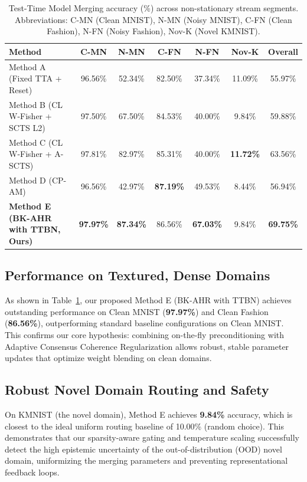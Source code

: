 \documentclass{article}
\theoremstyle{plain}
\theoremstyle{definition}
\theoremstyle{remark}
\begin{document}
\begin{table}[t]
  \caption{Test-Time Model Merging accuracy (\%) across non-stationary stream segments. Abbreviations: C-MN (Clean MNIST), N-MN (Noisy MNIST), C-FN (Clean Fashion), N-FN (Noisy Fashion), Nov-K (Novel KMNIST).}
  \label{tab:results}
  \vskip 0.15in
  \begin{center}
    \begin{small}
      \begin{tabular}{lcccccc}
        \toprule
        Method & C-MN & N-MN & C-FN & N-FN & Nov-K & Overall \\
        \midrule
        Method A (Fixed TTA + Reset) & 96.56\% & 52.34\% & 82.50\% & 37.34\% & 11.09\% & 55.97\% \\
        Method B (CL W-Fisher + SCTS L2) & 97.50\% & 67.50\% & 84.53\% & 40.00\% & 9.84\% & 59.88\% \\
        Method C (CL W-Fisher + A-SCTS) & 97.81\% & 82.97\% & 85.31\% & 40.00\% & \textbf{11.72\%} & 63.56\% \\
        Method D (CP-AM) & 96.56\% & 42.97\% & \textbf{87.19\%} & 49.53\% & 8.44\% & 56.94\% \\
        \midrule
        \textbf{Method E (BK-AHR with TTBN, Ours)} & \textbf{97.97\%} & \textbf{87.34\%} & 86.56\% & \textbf{67.03\%} & 9.84\% & \textbf{69.75\%} \\
        \bottomrule
      \end{tabular}
    \end{small}
  \end{center}
  \vskip -0.1in
\end{table}

\subsection{Performance on Textured, Dense Domains}
As shown in Table~\ref{tab:results}, our proposed Method E (BK-AHR with TTBN) achieves outstanding performance on Clean MNIST (\textbf{97.97\%}) and Clean Fashion (\textbf{86.56\%}), outperforming standard baseline configurations on Clean MNIST. This confirms our core hypothesis: combining on-the-fly preconditioning with Adaptive Consensus Coherence Regularization allows robust, stable parameter updates that optimize weight blending on clean domains.

\subsection{Robust Novel Domain Routing and Safety}
On KMNIST (the novel domain), Method E achieves \textbf{9.84\%} accuracy, which is closest to the ideal uniform routing baseline of 10.00\% (random choice). This demonstrates that our sparsity-aware gating and temperature scaling successfully detect the high epistemic uncertainty of the out-of-distribution (OOD) novel domain, uniformizing the merging parameters and preventing representational feedback loops.
\end{document}
